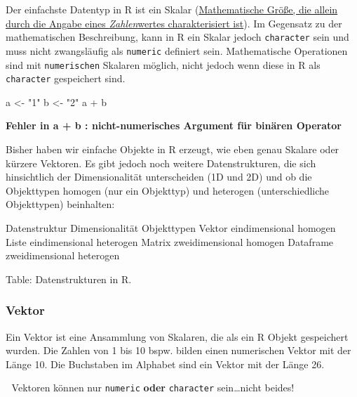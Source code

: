 \documentclass[
]{article}
\newenvironment{Shaded}{\begin{snugshade}}{\end{snugshade}}
\newcommand{\NormalTok}[1]{#1}
\newcommand{\OtherTok}[1]{\textcolor[rgb]{0.56,0.35,0.01}{#1}}
\newcommand{\SpecialCharTok}[1]{\textcolor[rgb]{0.00,0.00,0.00}{#1}}
\newcommand{\StringTok}[1]{\textcolor[rgb]{0.31,0.60,0.02}{#1}}
\begin{document}
Der einfachste Datentyp in R ist ein Skalar (\href{https://de.wikipedia.org/wiki/Skalar_(Mathematik)}{Mathematische Größe, die allein durch die Angabe eines \emph{Zahlen}wertes charakterisiert ist}). Im Gegensatz zu der mathematischen Beschreibung, kann in R ein Skalar jedoch \texttt{character} sein und muss nicht zwangsläufig als \texttt{numeric} definiert sein. Mathematische Operationen sind mit \texttt{numerischen} Skalaren möglich, nicht jedoch wenn diese in R als \texttt{character} gespeichert sind.

\begin{Shaded}
\begin{Highlighting}[]
\NormalTok{a }\OtherTok{\textless{}{-}} \StringTok{"1"}
\NormalTok{b }\OtherTok{\textless{}{-}} \StringTok{"2"}
\NormalTok{a }\SpecialCharTok{+}\NormalTok{ b}
\end{Highlighting}
\end{Shaded}

\textbf{Fehler in a + b : nicht-numerisches Argument für binären Operator}

Bisher haben wir einfache Objekte in R erzeugt, wie eben genau Skalare oder kürzere Vektoren. Es gibt jedoch noch weitere Datenstrukturen, die sich hinsichtlich der Dimensionalität unterscheiden (1D und 2D) und ob die Objekttypen homogen (nur ein Objekttyp) und heterogen (unterschiedliche Objekttypen) beinhalten:

\textbar Datenstruktur \textbar{} Dimensionalität \textbar{} Objekttypen\textbar{}
\textbar Vektor \textbar{} eindimensional \textbar{} homogen\textbar{}
\textbar Liste \textbar{} eindimensional \textbar heterogen\textbar{}
\textbar Matrix \textbar{} zweidimensional \textbar{} homogen\textbar{}
\textbar Dataframe \textbar{} zweidimensional \textbar heterogen\textbar{}

Table: Datenstrukturen in R.

\hypertarget{vektor}{%
\subsubsection{Vektor}\label{vektor}}

Ein Vektor ist eine Ansammlung von Skalaren, die als ein R Objekt gespeichert wurden. Die Zahlen von 1 bis 10 bspw. bilden einen numerischen Vektor mit der Länge 10. Die Buchstaben im Alphabet sind ein Vektor mit der Länge 26.

🚨 Vektoren können nur \texttt{numeric} \textbf{oder} \texttt{character} sein\ldots nicht beides!
\end{document}
